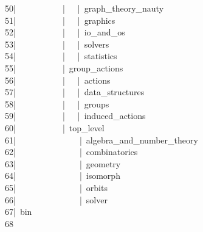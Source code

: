 \begin{tabbing}
50\>|  \ \ \ \ \ \ \ \ \ |  \ |\ graph\_theory\_nauty\\[0pt]
51\>|  \ \ \ \ \ \ \ \ \ |  \ |\ graphics\\[0pt]
52\>|  \ \ \ \ \ \ \ \ \ |  \ |\ io\_and\_os\\[0pt]
53\>|  \ \ \ \ \ \ \ \ \ |  \ |\ solvers\\[0pt]
54\>|  \ \ \ \ \ \ \ \ \ |  \ |\ statistics\\[0pt]
55\>|  \ \ \ \ \ \ \ \ \ |\ group\_actions\\[0pt]
56\>|  \ \ \ \ \ \ \ \ \ |  \ |\ actions\\[0pt]
57\>|  \ \ \ \ \ \ \ \ \ |  \ |\ data\_structures\\[0pt]
58\>|  \ \ \ \ \ \ \ \ \ |  \ |\ groups\\[0pt]
59\>|  \ \ \ \ \ \ \ \ \ |  \ |\ induced\_actions\\[0pt]
60\>|  \ \ \ \ \ \ \ \ \ |\ top\_level\\[0pt]
61\>|  \ \ \ \ \ \ \ \ \ \ \ \ \ |\ algebra\_and\_number\_theory\\[0pt]
62\>|  \ \ \ \ \ \ \ \ \ \ \ \ \ |\ combinatorics\\[0pt]
63\>|  \ \ \ \ \ \ \ \ \ \ \ \ \ |\ geometry\\[0pt]
64\>|  \ \ \ \ \ \ \ \ \ \ \ \ \ |\ isomorph\\[0pt]
65\>|  \ \ \ \ \ \ \ \ \ \ \ \ \ |\ orbits\\[0pt]
66\>|  \ \ \ \ \ \ \ \ \ \ \ \ \ |\ solver\\[0pt]
67\>|\ bin\\[0pt]
68\>\end{tabbing}
